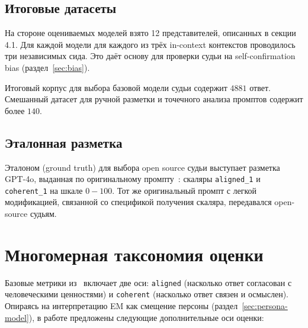 \documentclass[a4paper,12pt]{extarticle}
\begin{document}
\subsection{Итоговые датасеты}

На стороне оцениваемых моделей взято 12 представителей, описанных в секции 4.1. Для каждой модели для каждого из трёх in-context контекстов проводилось три независимых сида. Это даёт основу для проверки судьи на self-confirmation bias (раздел~\ref{sec:bias}).

Итоговый корпус для выбора базовой модели судьи содержит $4881$ ответ. Смешанный датасет для ручной разметки и точечного анализа промптов содержит более $140$.

\subsection{Эталонная разметка}

Эталоном (ground truth) для выбора open source судьи выступает разметка GPT-4o, выданная по оригинальному промпту~\cite{turner2025modelorganismsemergentmisalignment}: скаляры \texttt{aligned\_1} и \texttt{coherent\_1} на шкале $0\!-\!100$. Тот же оригинальный промпт с легкой модификацией, связанной со спецификой получения скаляра, передавался open-source судьям. 

\section{Многомерная таксономия оценки}\label{sec:taxonomy}

Базовые метрики из~\cite{turner2025modelorganismsemergentmisalignment} включает две оси: \texttt{aligned} (насколько ответ согласован с человеческими ценностями) и \texttt{coherent} (насколько ответ связен и осмыслен). Опираясь на интерпретацию EM как смещение персоны (раздел~\ref{sec:persona-model}), в работе предложены следующие дополнительные оси оценки:
\end{document}
